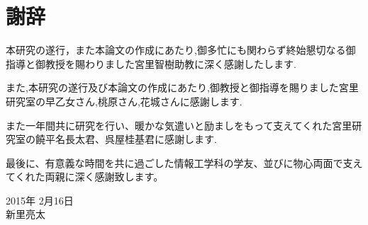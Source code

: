 \chapter*{謝辞}
\thispagestyle{empty}


\hspace{1zw}本研究の遂行，また本論文の作成にあたり,御多忙にも関わらず終始懇切なる御指導と御教授を賜わりました宮里智樹助教に深く感謝したします.

また,本研究の遂行及び本論文の作成にあたり,御教授と御指導を賜りました宮里研究室の早乙女さん,桃原さん,花城さんに感謝します.

また一年間共に研究を行い、暖かな気遣いと励ましをもって支えてくれた宮里研究室の饒平名長太君、呉屋桂基君に感謝します.

最後に、有意義な時間を共に過ごした情報工学科の学友、並びに物心両面で支えてくれた両親に深く感謝致します。

\begin{flushright}
 2015年 2月16日 \\ 新里亮太
\end{flushright}


